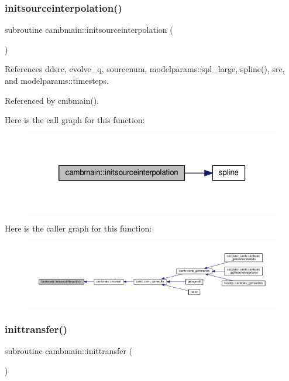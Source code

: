 \subsubsection{\texorpdfstring{initsourceinterpolation()}{initsourceinterpolation()}}
{\footnotesize\ttfamily subroutine cambmain\+::initsourceinterpolation (\begin{DoxyParamCaption}{ }\end{DoxyParamCaption})}



References ddsrc, evolve\+\_\+q, sourcenum, modelparams\+::spl\+\_\+large, spline(), src, and modelparams\+::timesteps.



Referenced by cmbmain().

Here is the call graph for this function\+:
\nopagebreak
\begin{figure}[H]
\begin{center}
\leavevmode
\includegraphics[width=320pt]{namespacecambmain_a4af989c7e3c97477fc61f6b31dd053e7_cgraph}
\end{center}
\end{figure}
Here is the caller graph for this function\+:
\nopagebreak
\begin{figure}[H]
\begin{center}
\leavevmode
\includegraphics[width=350pt]{namespacecambmain_a4af989c7e3c97477fc61f6b31dd053e7_icgraph}
\end{center}
\end{figure}
\mbox{\label{namespacecambmain_a556b6e83160b14e40cffab6e0deb6e12}} 
\subsubsection{\texorpdfstring{inittransfer()}{inittransfer()}}
{\footnotesize\ttfamily subroutine cambmain\+::inittransfer (\begin{DoxyParamCaption}{ }\end{DoxyParamCaption})\hspace{0.3cm}{\ttfamily [private]}}



